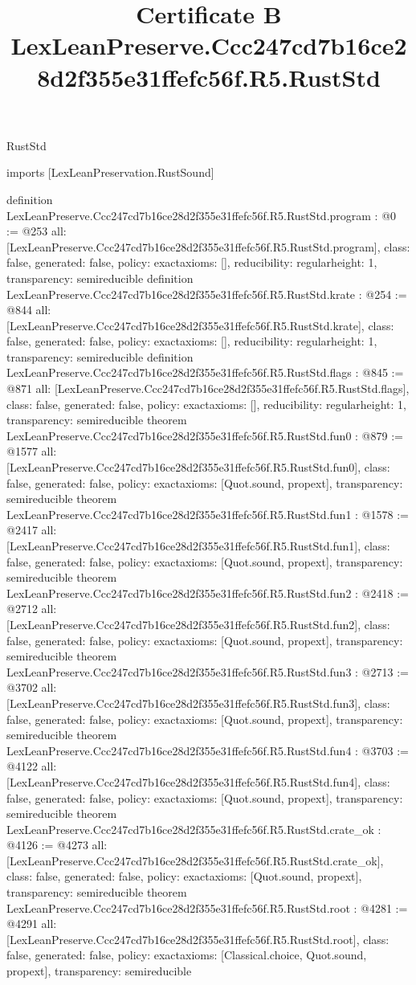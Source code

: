 \begin{lexlean}{RustStd}
\title{Certificate B LexLeanPreserve.Ccc247cd7b16ce28d2f355e31ffefc56f.R5.RustStd}
\begin{coremodule}
imports [LexLeanPreservation.RustSound]

definition LexLeanPreserve.Ccc247cd7b16ce28d2f355e31ffefc56f.R5.RustStd.program : @0 := @253 {
  all: [LexLeanPreserve.Ccc247cd7b16ce28d2f355e31ffefc56f.R5.RustStd.program],
  class: false,
  generated: false,
  policy: exact{axioms: []},
  reducibility: regular{height: 1},
  transparency: semireducible
}
definition LexLeanPreserve.Ccc247cd7b16ce28d2f355e31ffefc56f.R5.RustStd.krate : @254 := @844 {
  all: [LexLeanPreserve.Ccc247cd7b16ce28d2f355e31ffefc56f.R5.RustStd.krate],
  class: false,
  generated: false,
  policy: exact{axioms: []},
  reducibility: regular{height: 1},
  transparency: semireducible
}
definition LexLeanPreserve.Ccc247cd7b16ce28d2f355e31ffefc56f.R5.RustStd.flags : @845 := @871 {
  all: [LexLeanPreserve.Ccc247cd7b16ce28d2f355e31ffefc56f.R5.RustStd.flags],
  class: false,
  generated: false,
  policy: exact{axioms: []},
  reducibility: regular{height: 1},
  transparency: semireducible
}
theorem LexLeanPreserve.Ccc247cd7b16ce28d2f355e31ffefc56f.R5.RustStd.fun0 : @879 := @1577 {
  all: [LexLeanPreserve.Ccc247cd7b16ce28d2f355e31ffefc56f.R5.RustStd.fun0],
  class: false,
  generated: false,
  policy: exact{axioms: [Quot.sound, propext]},
  transparency: semireducible
}
theorem LexLeanPreserve.Ccc247cd7b16ce28d2f355e31ffefc56f.R5.RustStd.fun1 : @1578 := @2417 {
  all: [LexLeanPreserve.Ccc247cd7b16ce28d2f355e31ffefc56f.R5.RustStd.fun1],
  class: false,
  generated: false,
  policy: exact{axioms: [Quot.sound, propext]},
  transparency: semireducible
}
theorem LexLeanPreserve.Ccc247cd7b16ce28d2f355e31ffefc56f.R5.RustStd.fun2 : @2418 := @2712 {
  all: [LexLeanPreserve.Ccc247cd7b16ce28d2f355e31ffefc56f.R5.RustStd.fun2],
  class: false,
  generated: false,
  policy: exact{axioms: [Quot.sound, propext]},
  transparency: semireducible
}
theorem LexLeanPreserve.Ccc247cd7b16ce28d2f355e31ffefc56f.R5.RustStd.fun3 : @2713 := @3702 {
  all: [LexLeanPreserve.Ccc247cd7b16ce28d2f355e31ffefc56f.R5.RustStd.fun3],
  class: false,
  generated: false,
  policy: exact{axioms: [Quot.sound, propext]},
  transparency: semireducible
}
theorem LexLeanPreserve.Ccc247cd7b16ce28d2f355e31ffefc56f.R5.RustStd.fun4 : @3703 := @4122 {
  all: [LexLeanPreserve.Ccc247cd7b16ce28d2f355e31ffefc56f.R5.RustStd.fun4],
  class: false,
  generated: false,
  policy: exact{axioms: [Quot.sound, propext]},
  transparency: semireducible
}
theorem LexLeanPreserve.Ccc247cd7b16ce28d2f355e31ffefc56f.R5.RustStd.crate_ok : @4126 := @4273 {
  all: [LexLeanPreserve.Ccc247cd7b16ce28d2f355e31ffefc56f.R5.RustStd.crate_ok],
  class: false,
  generated: false,
  policy: exact{axioms: [Quot.sound, propext]},
  transparency: semireducible
}
theorem LexLeanPreserve.Ccc247cd7b16ce28d2f355e31ffefc56f.R5.RustStd.root : @4281 := @4291 {
  all: [LexLeanPreserve.Ccc247cd7b16ce28d2f355e31ffefc56f.R5.RustStd.root],
  class: false,
  generated: false,
  policy: exact{axioms: [Classical.choice, Quot.sound, propext]},
  transparency: semireducible
}


\end{coremodule}
\end{lexlean}

